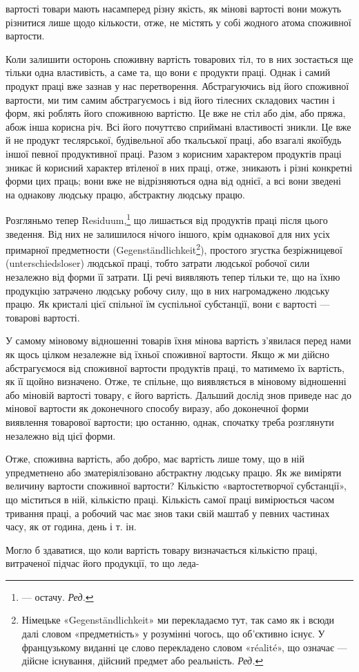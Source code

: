 вартості товари мають насамперед різну якість, як мінові вартості
вони можуть різнитися лише щодо кількости, отже, не
містять у собі жодного атома споживної вартости.

Коли залишити осторонь споживну вартість товарових тіл,
то в них зостається ще тільки одна властивість, а саме та, що
вони є продукти праці. Однак і самий продукт праці вже зазнав
у нас перетворення. Абстрагуючись від його споживної вартости,
ми тим самим абстрагуємось і від його тілесних складових частин
і форм, які роблять його споживною вартістю. Це вже не стіл або
дім, або пряжа, абож інша корисна річ. Всі його почуттєво сприймані
властивості зникли. Це вже й не продукт теслярської, будівельної
або ткальської праці, або взагалі якоїбудь іншої певної
продуктивної праці. Разом з корисним характером продуктів
праці зникає й корисний характер втіленої в них праці, отже,
зникають і різні конкретні форми цих праць; вони вже не відрізняються
одна від однієї, а всі вони зведені на однакову людську
працю, абстрактну людську працю.

Розгляньмо тепер Residuum,\footnote*{
— остачу. \emph{Ред.}
} що лишається від продуктів
праці після цього зведення. Від них не залишилося нічого іншого,
крім однакової для них усіх примарної предметности (Gegenständlichkeit\footnote*{
Німецьке «Gegenständlichkeit» ми перекладаємо тут, так само як
і всюди далі словом «предметність» у розумінні чогось, що об’єктивно
існує. У французькому виданні це слово перекладено словом «réalité»,
що означає — дійсне існування, дійсний предмет або реальність. \emph{Ред.}
}),
простого згустка безріжницевої (unterschiedsloser)
людської праці, тобто затрати людської робочої сили незалежно
від форми її затрати. Ці речі виявляють тепер тільки те,
що на їхню продукцію затрачено людську робочу силу, що в них
нагромаджено людську працю. Як кристалі цієї спільної їм суспільної
субстанції, вони є вартості — товарові вартості.

У самому міновому відношенні товарів їхня мінова вартість
з’явилася перед нами як щось цілком незалежне від їхньої споживної
вартости. Якщо ж ми дійсно абстрагуємося від споживної
вартости продуктів праці, то матимемо їх вартість, як її щойно
визначено. Отже, те спільне, що виявляється в міновому відношенні
або міновій вартості товару, є його вартість. Дальший дослід
знов приведе нас до мінової вартости як доконечного способу
виразу, або доконечної форми виявлення товарової вартости; цю
останню, однак, спочатку треба розглянути незалежно від цієї форми.

Отже, споживна вартість, або добро, має вартість лише тому,
що в ній упредметнено або зматеріялізовано абстрактну людську
працю. Як же виміряти величину вартости споживної вартости?
Кількістю «вартостетворчої субстанції», що міститься в ній,
кількістю праці. Кількість самої праці вимірюється часом тривання
праці, а робочий час має знов таки свій маштаб у певних
частинах часу, як от година, день і т. ін.

Могло б здаватися, що коли вартість товару визначається
кількістю праці, витраченої підчас його продукції, то що леда-